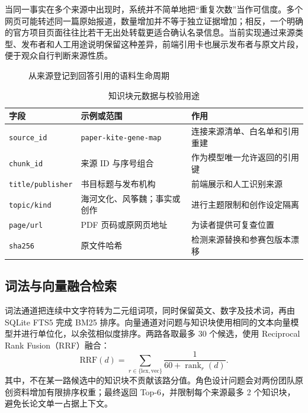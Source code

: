 \documentclass[UTF8,zihao=-4,fontset=none,twoside]{ctexart}
\newcommand{\code}[1]{\mbox{\texttt{#1}}\nobreak}
\begin{document}
当同一事实在多个来源中出现时，系统并不简单地把“重复次数”当作可信度。多个网页可能转述同一篇原始报道，数量增加并不等于独立证据增加；相反，一个明确的官方项目页面往往比若干无出处转载更适合确认名录信息。当前实现通过来源类型、发布者和人工用途说明保留这种差异，前端引用卡也展示发布者与原文片段，便于观众自行判断来源性质。

\begin{figure}[htbp]
  \centering
  \resizebox{\linewidth}{!}{}
  \caption{从来源登记到回答引用的语料生命周期}
  \label{fig:source-lifecycle}
\end{figure}

\begin{table}[htbp]
\centering
\caption{知识块元数据与校验用途}
\label{tab:chunk-metadata}
\small
\begin{tabularx}{\linewidth}{@{}P{31mm}P{36mm}Y@{}}
\toprule
字段 & 示例或范围 & 作用 \\
\midrule
\code{source\_id} & \code{paper-kite-}\newline\code{gene-map} & 连接来源清单、白名单和引用重建 \\
\code{chunk\_id} & 来源 ID 与序号组合 & 作为模型唯一允许返回的引用键 \\
\code{title/publisher} & 书目标题与发布机构 & 前端展示和人工识别来源 \\
\code{topic/kind} & 海河文化、风筝魏；事实或创作 & 进行主题限制和创作设定隔离 \\
\code{page/url} & PDF 页码或原网页地址 & 为读者提供可复查位置 \\
\code{sha256} & 原文件哈希 & 检测来源替换和参赛包版本漂移 \\
\bottomrule
\end{tabularx}
\end{table}

\subsection{词法与向量融合检索}

词法通道把连续中文字符转为二元组词项，同时保留英文、数字及技术词，再由 SQLite FTS5 完成 BM25 排序\cite{sqlitefts5}。向量通道对问题与知识块使用相同的文本向量模型并进行单位化，以余弦相似度排序。两路各取最多 30 个候选，使用 Reciprocal Rank Fusion（RRF）\cite{cormack2009rrf}融合：
\begin{equation}
  \mathrm{RRF}(d)=\sum_{r\in\{\mathrm{lex},\mathrm{vec}\}}
  \frac{1}{60+\operatorname{rank}_{r}(d)} .
  \label{eq:rrf}
\end{equation}
其中，不在某一路候选中的知识块不贡献该路分值。角色设计问题会对两份团队原创资料增加有限排序权重；最终返回 Top-6，并限制每个来源最多 2 个知识块，避免长论文单一占据上下文。
\end{document}
